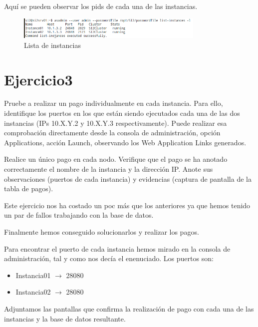 \documentclass[a4paper, 10pt]{article}
\begin{document}
 	Aquí se pueden observar los pids de cada una de las instancias.
 	\begin{figure}[hbtp]
 		\centering
 		\includegraphics[width=0.8\textwidth]{../../P3/pantallazos/ej2_listar_instancias.png}
 		\caption {Lista de instancias}
 	\end{figure}
 \newpage
 \section{Ejercicio3}
 
 \begin{mdframed}
 	 Pruebe a realizar un pago individualmente en cada instancia. Para ello, identifique los
 	 puertos en los que están siendo ejecutados cada una de las dos instancias (IPs 10.X.Y.2 y 10.X.Y.3
 	 respectivamente). Puede realizar esa comprobación directamente desde la consola de administración,
 	 opción Applications, acción Launch, observando los Web Application Links generados.
 	 
 	 Realice un único pago en cada nodo. Verifique que el pago se ha anotado correctamente el nombre de la
 	 instancia y la dirección IP. Anote sus observaciones (puertos de cada instancia) y evidencias (captura de
 	 pantalla de la tabla de pagos). 
 \end{mdframed}
 
Este ejercicio nos ha costado un poc más que los anteriores ya que hemos tenido un par de fallos trabajando con la base de datos.

Finalmente hemos conseguido solucionarlos y realizar los pagos.

Para encontrar el puerto de cada instancia hemos mirado en la consola de administración, tal y como nos decía el enenuciado. Los puertos son:
\begin{itemize}
	\item Instancia01 $\rightarrow$ 28080
	\item Instancia02 $\rightarrow$ 28080
\end{itemize}

Adjuntamos las pantallas que confirma la realización de pago con cada una de las instancias y la base de datos resultante.
\end{document}

